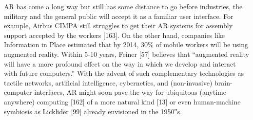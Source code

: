 AR has come a long way but still has some distance to go
before industries, the military and the general public will
accept it as a familiar user interface. For example, Airbus
CIMPA still struggles to get their AR systems for assembly
support accepted by the workers [163]. On the other hand,
companies like Information in Place estimated that by 2014,
30\% of mobile workers will be using augmented reality.
Within 5-10 years, Feiner [57] believes that “augmented
reality will have a more profound effect on the way in which
we develop and interact with future computers.” With the
advent of such complementary technologies as tactile networks,
artificial intelligence, cybernetics, and (non-invasive)
brain-computer interfaces, AR might soon pave the way for
ubiquitous (anytime-anywhere) computing [162] of a more
natural kind [13] or even human-machine symbiosis as
Licklider [99] already envisioned in the 1950‟s.